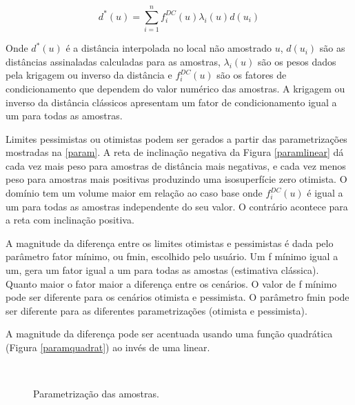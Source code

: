\begin{equation}
\label{estimador_k}
d^*(u)=\sum_{i=1}^{n} f^{DC}_i(u) \lambda_i(u) d(u_i)
\end{equation}

Onde $d^*(u)$ é a distância interpolada no local não amostrado $u$, $d(u_i)$ são as distâncias assinaladas calculadas para as amostras, $\lambda_i(u)$ são os pesos dados pela krigagem ou inverso da distância e $f^{DC}_i(u)$ são os fatores de condicionamento que dependem do valor numérico das amostras. A krigagem ou inverso da distância clássicos apresentam um fator de condicionamento igual a um para todas as amostras.

Limites pessimistas ou otimistas podem ser gerados a partir das parametrizações mostradas na \autoref{param}. A reta de inclinação negativa da Figura \autoref{paramlinear} dá cada vez mais peso para amostras de distância mais negativas, e cada vez menos peso para amostras mais positivas produzindo uma isosuperfície zero otimista. O domínio tem um volume maior em relação ao caso base onde $f^{DC}_i(u)$ é igual a um para todas as amostras independente do seu valor. O contrário acontece para a reta com inclinação positiva. 

A magnitude da diferença entre os limites otimistas e pessimistas é dada pelo parâmetro fator mínimo, ou fmin, escolhido pelo usuário. Um f mínimo igual a um, gera um fator igual a um para todas as amostas (estimativa clássica). Quanto maior o fator maior a diferença entre os cenários. O valor de f mínimo pode ser diferente para os cenários otimista e pessimista. O parâmetro fmin pode ser diferente para as diferentes parametrizações (otimista e pessimista).

A magnitude da diferença pode ser acentuada usando uma função quadrática (Figura \autoref{paramquadrat}) ao invés de uma linear.

\begin{figure}[H] 
    \centering
    \caption{Parametrização das amostras.} \label{param}
      \\
\end{figure}


